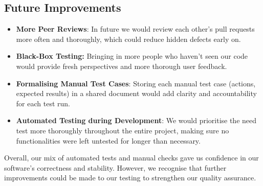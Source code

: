 \subsection{Future Improvements} \begin{itemize} \item \textbf{More Peer Reviews}: In future we would review each other’s pull requests more often and thoroughly, which could reduce hidden defects early on. \item \textbf{Black-Box Testing:} Bringing in more people who haven’t seen our code would provide fresh perspectives and more thorough user feedback. \item \textbf{Formalising Manual Test Cases}: Storing each manual test case (actions, expected results) in a shared document would add clarity and accountability for each test run.
\item \textbf{Automated Testing during Development}: We would prioritise the need test more thoroughly throughout the entire project, making sure no functionalities were left untested for longer than necessary.\end{itemize}

\noindent Overall, our mix of automated tests and manual checks gave us confidence in our software’s correctness and stability. However, we recognise that further improvements could be made to our testing to strengthen our quality assurance.